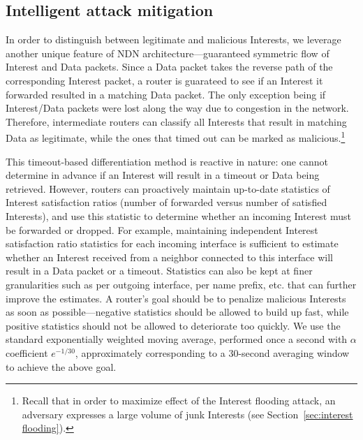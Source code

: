 
\subsection{Intelligent attack mitigation}
\label{sec:intelligent mitigating}


In order to distinguish between legitimate and malicious Interests, we leverage another unique feature of  NDN architecture---guaranteed symmetric flow of Interest and Data packets. Since a Data packet takes the reverse path of the corresponding Interest packet, a router is guarateed to see if an Interest it forwarded resulted in a matching Data packet. The only exception being if Interest/Data packets were lost along the way due to congestion in the network.
Therefore, intermediate routers can classify all Interests that result in matching Data as legitimate, while the ones that timed out can be marked as malicious.\footnote{Recall that in order to maximize effect of the Interest flooding attack, an adversary expresses a large volume of junk Interests (see Section~\ref{sec:interest flooding}).}  

This timeout-based differentiation method is reactive in nature: one cannot determine in advance if an Interest will result in a timeout or Data being retrieved. However, routers can proactively maintain up-to-date statistics of Interest satisfaction ratios (number of forwarded versus number of satisfied Interests), and use this statistic to determine whether an incoming Interest must be forwarded or dropped. For example, maintaining independent Interest satisfaction ratio statistics for each incoming interface is sufficient to estimate whether an Interest received from a neighbor connected to this interface will result in a Data packet or a timeout. Statistics can also be kept at finer granularities such as per outgoing interface, per name prefix, etc. that can further improve the estimates. A router's goal should be to penalize malicious Interests as soon as possible---negative statistics should be allowed to build up fast, while positive statistics should not be allowed to deteriorate too quickly. We use the standard exponentially weighted moving average, performed once a second with $\alpha$ coefficient $e^{-1/30}$, approximately corresponding to a 30-second averaging window to achieve the above goal.

